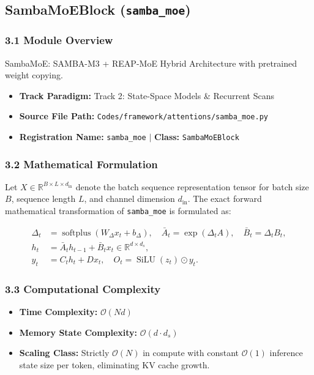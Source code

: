 \subsection{SambaMoEBlock (\texttt{samba\_moe})}
\label{sec:app_module_samba_moe}

\subsubsection*{3.1 Module Overview}
SambaMoE: SAMBA-M3 + REAP-MoE Hybrid Architecture with pretrained weight copying.
\begin{itemize}
    \item \textbf{Track Paradigm:} Track 2: State-Space Models \& Recurrent Scans
    \item \textbf{Source File Path:} \texttt{Codes/framework/attentions/samba\_moe.py}
    \item \textbf{Registration Name:} \texttt{samba\_moe} $\mid$ \textbf{Class:} \texttt{SambaMoEBlock}
\end{itemize}

\subsubsection*{3.2 Mathematical Formulation}
Let $X \in \mathbb{R}^{B \times L \times d_{\text{in}}}$ denote the batch sequence representation tensor for batch size $B$, sequence length $L$, and channel dimension $d_{\text{in}}$. The exact forward mathematical transformation of \texttt{samba\_moe} is formulated as:

\begin{align}
\Delta_t &= \operatorname{softplus}(W_\Delta x_t + b_\Delta), \quad \bar{A}_t = \exp(\Delta_t A), \quad \bar{B}_t = \Delta_t B_t, \\
h_t &= \bar{A}_t h_{t-1} + \bar{B}_t x_t \in \mathbb{R}^{d \times d_s}, \\
y_t &= C_t h_t + D x_t, \quad O_t = \operatorname{SiLU}(z_t) \odot y_t.
\end{align}


\subsubsection*{3.3 Computational Complexity}
\begin{itemize}
    \item \textbf{Time Complexity:} $\mathcal{O}(N d)$
    \item \textbf{Memory State Complexity:} $\mathcal{O}(d \cdot d_s)$
    \item \textbf{Scaling Class:} Strictly $\mathcal{O}(N)$ in compute with constant $\mathcal{O}(1)$ inference state size per token, eliminating KV cache growth.
\end{itemize}

